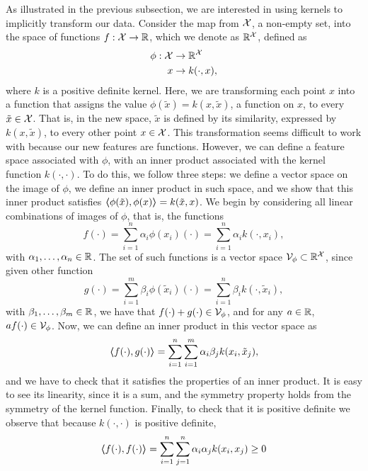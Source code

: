 As illustrated in the previous subsection, we are interested in using kernels to implicitly transform our data. Consider the map from $\mathcal{X}$, a non-empty set, into the space of functions $f: \mathcal{X} \to \mathbb{R}$, which we denote as $\mathbb{R}^{\mathcal{X}}$, defined as 
    \begin{equation}
        \begin{aligned}
            \nonumber
            \phi: \mathcal{X} &\to \mathbb{R}^{\mathcal{X}} \\
            x &\to k(\cdot, x) ,
        \end{aligned}
    \end{equation}
where $k$ is a positive definite kernel. Here, we are transforming each point $x$ into a function that assigns the value $\phi(\tilde{x}) = k(x, \tilde{x})$, a function on $x$, to every $\tilde{x} \in \mathcal{X}$. That is, in the new space, $\tilde{x}$ is defined by its similarity, expressed by $k(x, \tilde{x})$, to every other point ${x} \in \mathcal{X}$. This transformation seems difficult to work with because our new features are functions.
However, we can define a feature space associated with $\phi$, with an inner product associated with the kernel function $k(\cdot, \cdot)$. To do this, we follow three steps: we define a vector space on the image of $\phi$, we define an inner product in such space, and we show that this inner product satisfies $\bm{\left\langle} \phi(\tilde{x}), \phi(x) \bm{\right\rangle} = k(\tilde{x}, x)$.
We begin by considering all linear combinations of images of $\phi$, that is, the functions 
$$ f(\cdot) = \sum_{i=1}^n \alpha_i \phi(x_i)(\cdot) =\sum_{i=1}^n \alpha_i k(\cdot, x_i), $$
with $\alpha_1, \ldots, \alpha_n \in \mathbb{R}$.
The set of such functions is a vector space $\mathcal{V}_\phi \subset \mathbb{R}^{\mathcal{X}}$, since given other function 
$$ g(\cdot) = \sum_{i=1}^m \beta_i \phi(\tilde{x}_i)(\cdot) =\sum_{i=1}^n \beta_i k(\cdot, \tilde{x}_i) ,$$
with $\beta_1, \ldots, \beta_m \in \mathbb{R}$,
we have that $f(\cdot) + g(\cdot) \in \mathcal{V}_\phi$, and for any $a \in \mathbb{R}$,  $a f(\cdot) \in \mathcal{V}_\phi$.
Now, we can define an inner product in this vector space as 
$$ \bm{\left\langle} f(\cdot), g(\cdot) \bm{\right\rangle} = \sum_{i=1}^n \sum_{i=1}^m \alpha_i \beta_j k(x_i, \tilde{x}_j),$$
and we have to check that it satisfies the properties of an inner product. It is easy to see its linearity, since it is a sum, and the symmetry property holds from the symmetry of the kernel function. Finally, to check that it is positive definite we observe that because $k(\cdot, \cdot)$ is positive definite,
$$ \bm{\left\langle} f(\cdot), f(\cdot) \bm{\right\rangle} = \sum_{i=1}^n \sum_{j=1}^n \alpha_i \alpha_j k(x_i, x_j) \geq 0$$
